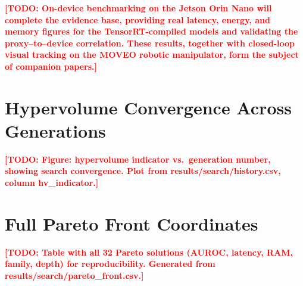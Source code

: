 \documentclass[journal]{IEEEtran}
\newcommand{\TODO}[1]{\textcolor{red}{\textbf{[TODO: #1]}}}
\begin{document}
\TODO{On-device benchmarking on the Jetson Orin Nano will complete the
evidence base, providing real latency, energy, and memory figures for the
TensorRT-compiled models and validating the proxy--to--device correlation.
These results, together with closed-loop visual tracking on the MOVEO robotic
manipulator, form the subject of companion papers.}

\appendix
\section{Hypervolume Convergence Across Generations}
\label{app:hv}

\TODO{Figure: hypervolume indicator vs.\ generation number, showing search
convergence. Plot from results/search/history.csv, column hv\_indicator.}

\section{Full Pareto Front Coordinates}
\label{app:pareto}

\TODO{Table with all 32 Pareto solutions (AUROC, latency, RAM, family, depth)
for reproducibility. Generated from results/search/pareto\_front.csv.}



\end{document}
